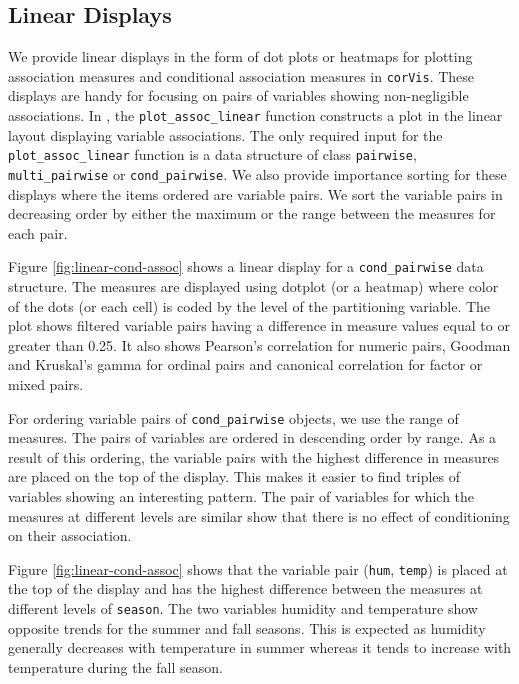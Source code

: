 \hypertarget{linear-displays}{%
\subsection{Linear Displays}\label{linear-displays}}

We provide linear displays in the form of dot plots or heatmaps for plotting association measures and conditional association measures in \texttt{corVis}. These displays are handy for focusing on pairs of variables showing non-negligible associations. In , the \texttt{plot\_assoc\_linear} function constructs a plot in the linear layout displaying variable associations. The only required input for the \texttt{plot\_assoc\_linear} function is a data structure of class \texttt{pairwise}, \texttt{multi\_pairwise} or \texttt{cond\_pairwise}. We also provide importance sorting for these displays where the items ordered are variable pairs. We sort the variable pairs in decreasing order by either the maximum or the range between the measures for each pair.

Figure \ref{fig:linear-cond-assoc} shows a linear display for a \texttt{cond\_pairwise} data structure. The measures are displayed using dotplot (or a heatmap) where color of the dots (or each cell) is coded by the level of the partitioning variable. The plot shows filtered variable pairs having a difference in measure values equal to or greater than 0.25. It also shows Pearson's correlation for numeric pairs, Goodman and Kruskal's gamma for ordinal pairs and canonical correlation for factor or mixed pairs.

For ordering variable pairs of \texttt{cond\_pairwise} objects, we use the range of measures. The pairs of variables are ordered in descending order by range. As a result of this ordering, the variable pairs with the highest difference in measures are placed on the top of the display. This makes it easier to find triples of variables showing an interesting pattern. The pair of variables for which the measures at different levels are similar show that there is no effect of conditioning on their association.

Figure \ref{fig:linear-cond-assoc} shows that the variable pair (\texttt{hum}, \texttt{temp}) is placed at the top of the display and has the highest difference between the measures at different levels of \texttt{season}. The two variables humidity and temperature show opposite trends for the summer and fall seasons. This is expected as humidity generally decreases with temperature in summer whereas it tends to increase with temperature during the fall season.

